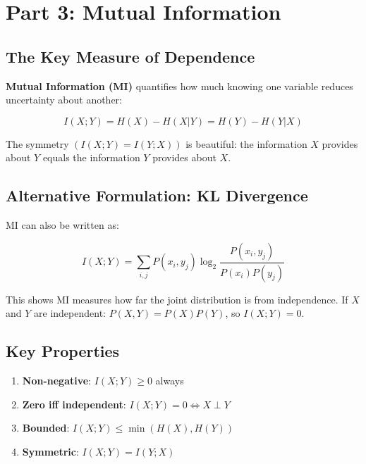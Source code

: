 \documentclass[
  11pt,
  letterpaper,
  oneside,
  openany]{book}
\providecommand{\tightlist}{%
  \setlength{\itemsep}{0pt}\setlength{\parskip}{0pt}}
\begin{document}
\section{Part 3: Mutual Information}\label{part-3-mutual-information}

\subsection{The Key Measure of
Dependence}\label{the-key-measure-of-dependence}

\textbf{Mutual Information (MI)} quantifies how much knowing one
variable reduces uncertainty about another:

\[I(X;Y) = H(X) - H(X|Y) = H(Y) - H(Y|X)\]

The symmetry \((I(X;Y) = I(Y;X))\) is beautiful: the information \(X\)
provides about \(Y\) equals the information \(Y\) provides about \(X\).

\subsection{Alternative Formulation: KL
Divergence}\label{alternative-formulation-kl-divergence}

MI can also be written as:

\[I(X;Y) = \sum_{i,j} P(x_i, y_j) \log_2 \frac{P(x_i, y_j)}{P(x_i)P(y_j)}\]

This shows MI measures how far the joint distribution is from
independence. If \(X\) and \(Y\) are independent: \(P(X,Y) = P(X)P(Y)\),
so \(I(X;Y) = 0\).

\subsection{Key Properties}\label{key-properties}

\begin{enumerate}
\def\labelenumi{\arabic{enumi}.}
\tightlist
\item
  \textbf{Non-negative}: \(I(X;Y) \geq 0\) always
\item
  \textbf{Zero iff independent}: \(I(X;Y) = 0 \iff X \perp Y\)
\item
  \textbf{Bounded}: \(I(X;Y) \leq \min(H(X), H(Y))\)
\item
  \textbf{Symmetric}: \(I(X;Y) = I(Y;X)\)
\end{enumerate}
\end{document}

